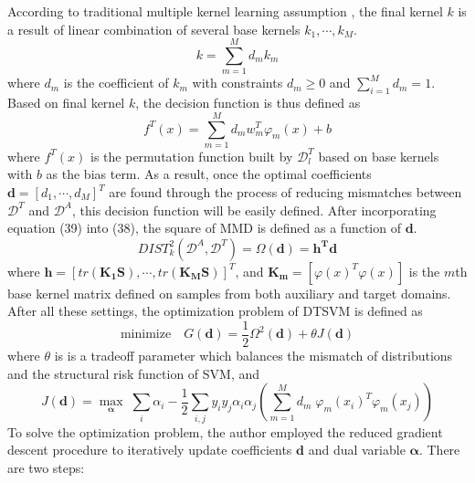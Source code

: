 \noindent According to traditional multiple kernel learning assumption \cite{lanckriet2004learning}, the final kernel $k$ is a result of linear combination of several base kernels $k_1, \cdots, k_M$.
\begin{equation}
k = \sum_{m=1}^{M}d_m k_m
\end{equation}
where $d_m$ is the coefficient of $k_m$ with constraints $d_m \geq 0$ and $\sum_{i=1}^{M}d_m = 1$. Based on final kernel $k$, the decision function is thus defined as
\begin{equation}
f^T(x) = \sum_{m=1}^{M} d_m w_m^T \varphi_m(x) + b 
\end{equation}
where $f^T(x)$ is the permutation function built by $\mathcal{D}_l^T$ based on base kernels with $b$ as the bias term. As a result, once the optimal coefficients $\mathbf{d}=[d_1, \cdots, d_M]^T$ are found through the process of reducing mismatches between $\mathcal{D}^T$ and $\mathcal{D}^A$, this decision function will be easily defined. After incorporating equation (39) into (38), the square of MMD is defined as a function of $\mathbf{d}$.
\begin{equation}
DIST_k^2(\mathcal{D}^A, \mathcal{D}^T) = \Omega(\mathbf{d}) = \mathbf{h^T d}
\end{equation}
where $\mathbf{h} = [tr(\mathbf{K_1 S}), \cdots, tr(\mathbf{K_MS})]^T$, and $\mathbf{K_m} = [\varphi(x)^T \varphi(x)]$ is the $m$th base kernel matrix defined on samples from both auxiliary and target domains. After all these settings, the optimization problem of DTSVM is defined as 
\begin{equation}
\text{minimize} \quad G(\mathbf{d}) = \frac{1}{2} \Omega^2(\mathbf{d}) + \theta J(\mathbf{d})
\end{equation}
where $\theta$ is is a tradeoff parameter which balances the mismatch of distributions and the structural risk function of SVM, and 
  \begin{equation}
  J(\mathbf{d}) = \underset{\boldsymbol{\alpha}}{\max} \; \sum_i \alpha_i - \frac{1}{2} \sum_{i,j} y_i y_j \alpha_i \alpha_j  (\sum_{m=1}^M d_m \; \varphi_m (x_i) ^T \varphi_m (x_j))           
  \end{equation}
To solve the optimization problem, the author \cite{duan2009domain} employed the reduced gradient descent procedure to iteratively update coefficients $\mathbf{d}$ and dual variable $\boldsymbol{\alpha}$. There are two steps:
